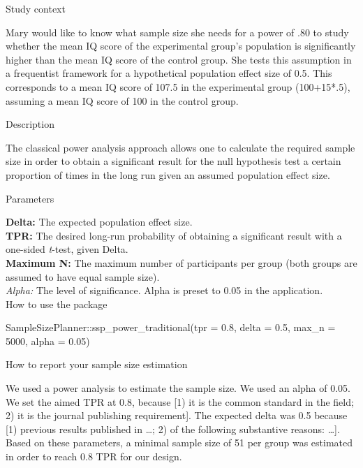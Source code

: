\documentclass[
  english,
  man,floatsintext]{apa6}
\newenvironment{Shaded}{\begin{snugshade}}{\end{snugshade}}
\newcommand{\AttributeTok}[1]{\textcolor[rgb]{0.77,0.63,0.00}{#1}}
\newcommand{\DecValTok}[1]{\textcolor[rgb]{0.00,0.00,0.81}{#1}}
\newcommand{\FloatTok}[1]{\textcolor[rgb]{0.00,0.00,0.81}{#1}}
\newcommand{\FunctionTok}[1]{\textcolor[rgb]{0.00,0.00,0.00}{#1}}
\newcommand{\NormalTok}[1]{#1}
\newcommand{\SpecialCharTok}[1]{\textcolor[rgb]{0.00,0.00,0.00}{#1}}
\begin{document}
Study context

Mary would like to know what sample size she needs for a power of .80 to study whether the mean IQ score of the experimental group's population is significantly higher than the mean IQ score of the control group. She tests this assumption in a frequentist framework for a hypothetical population effect size of 0.5. This corresponds to a mean IQ score of 107.5 in the experimental group (100+15*.5), assuming a mean IQ score of 100 in the control group.

Description

The classical power analysis approach allows one to calculate the required sample size in order to obtain a significant result for the null hypothesis test a certain proportion of times in the long run given an assumed population effect size.

Parameters

\textbf{Delta:} The expected population effect size.\\
\textbf{TPR:} The desired long-run probability of obtaining a significant result with a one-sided \emph{t}-test, given Delta.\\
\textbf{Maximum N:} The maximum number of participants per group (both groups are assumed to have equal sample size).\\
\emph{Alpha:} The level of significance. Alpha is preset to 0.05 in the application.\\

How to use the package

\begin{Shaded}
\begin{Highlighting}[]
\NormalTok{SampleSizePlanner}\SpecialCharTok{::}\FunctionTok{ssp\_power\_traditional}\NormalTok{(}\AttributeTok{tpr =} \FloatTok{0.8}\NormalTok{, }\AttributeTok{delta =} \FloatTok{0.5}\NormalTok{,}
    \AttributeTok{max\_n =} \DecValTok{5000}\NormalTok{, }\AttributeTok{alpha =} \FloatTok{0.05}\NormalTok{)}
\end{Highlighting}
\end{Shaded}

How to report your sample size estimation

We used a power analysis to estimate the sample size. We used an alpha of 0.05. We set the aimed TPR at 0.8, because {[}1) it is the common standard in the field; 2) it is the journal publishing requirement{]}. The expected delta was 0.5 because {[}1) previous results published in \ldots; 2) of the following substantive reasons: \ldots{]}. Based on these parameters, a minimal sample size of 51 per group was estimated in order to reach 0.8 TPR for our design.
\end{document}
